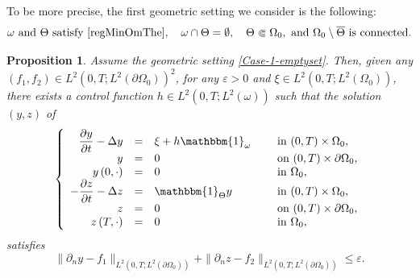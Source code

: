 \documentclass[10pt,a4paper]{amsart}
\newtheorem{proposition}[theorem]{Proposition}
\theoremstyle{definition}
\begin{document}
To be more precise, the first geometric setting we consider is the following:
\begin{equation}
\label{Case-1-emptyset}
\omega\text{ and }\Theta\text{ satisfy }\eqref{regMinOmThe},\quad
\omega \cap \Theta = \emptyset,
\quad \Theta \Subset \Omega_0,
\text{ and } \Omega_0 \setminus \overline\Theta \text{ is connected}.
\end{equation}

\begin{proposition}
\label{Prop-Approx-Cont-Case1}
Assume the geometric setting \eqref{Case-1-emptyset}. Then, given any $(f_1, f_2) \in L^2(0,T; L^2(\partial \Omega_0))^2$, for any $\varepsilon >0$ and $\xi \in L^2(0,T; L^2(\Omega_0))$, there exists a control function $h \in L^2(0,T; L^2(\omega))$ such that the solution $(y,z)$ of
\begin{equation}
\label{Coupled-Heat-Approx}
\left\{
\begin{array}{rcll}
\dfrac{\partial y}{\partial t}-\Delta y &=&\xi +h\mathbbm{1}_{\omega}\quad&\text{ in }(0,T) \times \Omega_0,
\\
y &=& 0 &\text{ on }(0,T) \times \partial \Omega_0,
\\
y\left(0,\cdot\right) &=& 0 &\text{ in }\Omega_0,
\\
-\dfrac{\partial z}{\partial t}-\Delta z &=&\mathbbm{1}_{\Theta}y &\text{ in }(0,T) \times \Omega_0,
\\
z &=& 0 &\text{ on }(0,T) \times \partial \Omega_0,
\\
z\left(T,\cdot\right) &=& 0 &\text{ in }\Omega_0,
\end{array}
\right.
\end{equation}
satisfies
\begin{equation}
\label{Approx-Cont}
\| \partial_n y - f_1 \|_{L^2(0,T; L^2(\partial\Omega_0))}
+
\| \partial_n z - f_2 \|_{L^2(0,T; L^2(\partial\Omega_0))}
\leq
\varepsilon.
\end{equation}
\end{proposition}
\end{document}
